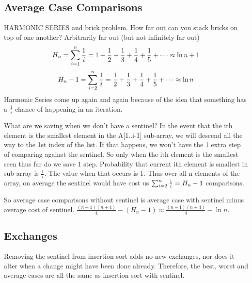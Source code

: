 \documentclass[english, 10pt]{article}
\begin{document}
\subsection{Average Case Comparisons}
\begin{rem}
HARMONIC SERIES and brick problem.
How far out can you stack bricks on top of one another? Arbitrarily far out (but not infinitely far out)
$$H_n = \sum_{i=1}^{n}\frac{1}{i} = 1+\frac{1}{2}+\frac{1}{3}+\frac{1}{4}+\frac{1}{5}+\cdots \approx \ln{n}+1$$
$$H_n -1 = \sum_{i=2}^{n}\frac{1}{i} = \frac{1}{2}+\frac{1}{3}+\frac{1}{4}+\frac{1}{5}+\cdots \approx \ln{n}$$
Harmonic Series come up again and again because of the idea that something has a $\frac{1}{i}$ chance of happening in an iteration.
\end{rem}
What are we saving when we don't have a sentinel? In the event that the ith element is the smallest element in the A[1..i-1] sub-array, we will descend all
the way to the 1st index of the list. If that happens, we won't have the 1 extra step of comparing against the sentinel. So only when the ith element is
the smallest seen thus far do we save 1 step.
Probability that current ith element is smallest in sub array is $\frac{1}{i}$. The value when that occurs is 1.
Thus over all n elements of the array, on average the sentinel would have cost us $\sum_{i=2}^{n}\frac{1}{i} = H_n -1$ comparisons.

So average case comparisons without sentinel is average case with sentinel minus average cost of sentinel.
$\frac{(n-1)(n+4)}{4}-(H_n -1) \approx \frac{(n-1)(n+4)}{4}-\ln{n}$.

\subsection{Exchanges}
Removing the sentinel from insertion sort adds no new exchanges, nor does it alter when a change might have been done already.
Therefore, the best, worst and average cases are all the same as insertion sort with sentinel.


\end{document}
